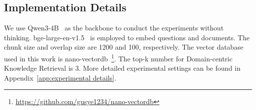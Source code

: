 \documentclass[11pt]{article}
\begin{document}
\subsection{Implementation Details}
We use Qwen3-4B~\cite{qwen3technicalreport} as the backbone to conduct the experiments without thinking. bge-large-en-v1.5~\cite{bge_embedding} is employed to embed questions and documents. 
The chunk size and overlap size are 1200 and 100, respectively. The vector database used in this work is nano-vectordb~\footnote{\url{https://github.com/gusye1234/nano-vectordb}}. 
The top-k number for Domain-centric Knowledge Retrieval is 3. 
More detailed experimental settings can be found in Appendix~\ref{app:experimental details}.
\end{document}
